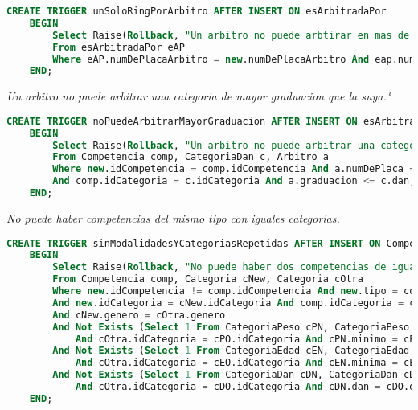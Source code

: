 \begin{lstlisting}[language=SQL]
CREATE TRIGGER unSoloRingPorArbitro AFTER INSERT ON esArbitradaPor
    BEGIN
        Select Raise(Rollback, "Un arbitro no puede arbtirar en mas de un ring.")
        From esArbitradaPor eAP 
        Where eAP.numDePlacaArbitro = new.numDePlacaArbitro And eap.numeroDeRing != new.numeroDeRing;
    END;

\end{lstlisting}
\emph{
  Un arbitro no puede arbitrar una categoria de mayor graduacion que la suya."
}

\begin{lstlisting}[language=SQL]
CREATE TRIGGER noPuedeArbitrarMayorGraduacion AFTER INSERT ON esArbitradaPor
    BEGIN
        Select Raise(Rollback, "Un arbitro no puede arbitrar una categoria de mayor graduacion que la suya.")
        From Competencia comp, CategoriaDan c, Arbitro a
        Where new.idCompetencia = comp.idCompetencia And a.numDePlaca = new.numDePlacaArbitro 
        And comp.idCategoria = c.idCategoria And a.graduacion <= c.dan;
    END;


\end{lstlisting}
\emph{
  No puede haber competencias del mismo tipo con iguales categorias.
}

\begin{lstlisting}[language=SQL]
CREATE TRIGGER sinModalidadesYCategoriasRepetidas AFTER INSERT ON Competencia
    BEGIN
        Select Raise(Rollback, "No puede haber dos competencias de igual modalidad y con categorias iguales .")
        From Competencia comp, Categoria cNew, Categoria cOtra
        Where new.idCompetencia != comp.idCompetencia And new.tipo = comp.tipo 
        And new.idCategoria = cNew.idCategoria And comp.idCategoria = cOtra.idCategoria 
        And cNew.genero = cOtra.genero
        And Not Exists (Select 1 From CategoriaPeso cPN, CategoriaPeso cPO Where cNew.idCategoria = cPN.idCategoria 
            And cOtra.idCategoria = cPO.idCategoria And cPN.minimo = cPO.minimo And cPN.maximo = cPO.maximo)
        And Not Exists (Select 1 From CategoriaEdad cEN, CategoriaEdad cEO Where cNew.idCategoria = cEN.idCategoria 
            And cOtra.idCategoria = cEO.idCategoria And cEN.minima = cEO.minima And cEN.maxima = cEO.maxima)
        And Not Exists (Select 1 From CategoriaDan cDN, CategoriaDan cDO Where cNew.idCategoria = cDN.idCategoria 
            And cOtra.idCategoria = cDO.idCategoria And cDN.dan = cDO.dan);
    END;
\end{lstlisting}
